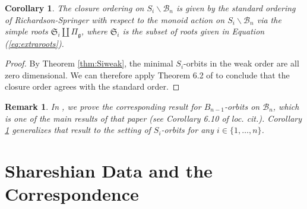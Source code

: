 \documentclass[12pt]{amsart}
\numberwithin{equation}{section}
\newtheorem{cor}[thm]{Corollary}
\newtheorem{rem}[thm]{Remark}
\newcommand{\fg}{\mbox{${\mathfrak g}$}}
\newcommand{\B}{\mathcal{B}}
\newcommand{\Sh}{\mathcal{S}h}
\begin{document}
\begin{cor}\label{c:standardorder}
The closure ordering on $S_{i}\backslash\B_{n}$ is given by the standard ordering 
of Richardson-Springer with respect to the monoid action on $S_{i}\backslash\B_{n}$ via the simple roots $\mathfrak{S}_i\coprod\Pi_{\fg}$, where $\mathfrak{S}_i$ is the subset of roots given in Equation (\ref{eq:extraroots}). 
\end{cor}
\begin{proof}
By Theorem \ref{thm:Siweak}, the minimal $S_{i}$-orbits in the weak order are all zero dimensional.  We can therefore apply Theorem 6.2 of \cite{CE21II} to conclude that the closure order agrees with the standard order. 
\end{proof}

\begin{rem}
In \cite{CE21II}, we prove the corresponding result for $B_{n-1}$-orbits on $\B_{n}$, which is one of the main results of that paper (see Corollary 6.10 of \emph{loc. cit.}).  Corollary \ref{c:standardorder} generalizes that result to the setting of $S_{i}$-orbits for \emph{any} $i\in\{1,\dots, n\}$. 
\end{rem}




\section{Shareshian Data and the Correspondence}\label{s:Shareshian}

 
 
\end{document}
